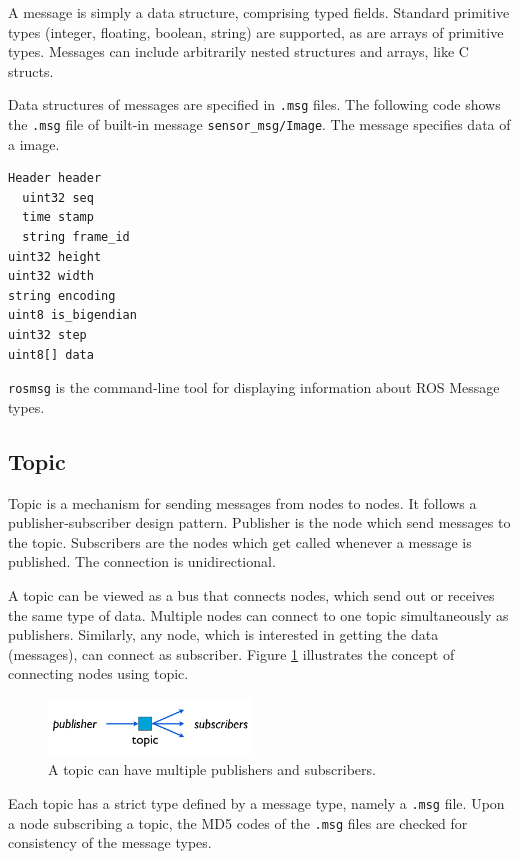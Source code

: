 \documentclass[a4paper, 10pt, conference]{ieeeconf}       %
\begin{document}
A message is simply a data structure, comprising typed fields. Standard primitive types (integer, floating, boolean, string) are supported, as are arrays of primitive types. Messages can include arbitrarily nested structures and arrays, like C structs.

Data structures of messages are specified in \texttt{.msg} files. The following code shows the \texttt{.msg} file of built-in message \texttt{sensor\_msg/Image}. The message specifies data of a image.

\vspace{8pt}
\begin{Verbatim}[frame=single]
Header header 
  uint32 seq 
  time stamp 
  string frame_id 
uint32 height 
uint32 width 
string encoding 
uint8 is_bigendian 
uint32 step 
uint8[] data
\end{Verbatim}

\texttt{rosmsg} is the command-line tool for displaying information about ROS Message types.

\subsection{Topic}

Topic is a mechanism for sending messages from nodes to nodes. It follows a publisher-subscriber design pattern. Publisher is the node which send messages to the topic. Subscribers are the nodes which get called whenever a message is published. The connection is unidirectional.

A topic can be viewed as a bus that connects nodes, which send out or receives the same type of data. Multiple nodes can connect to one topic simultaneously as publishers. Similarly, any node, which is interested in getting the data (messages), can connect as subscriber. Figure 
\ref{fig:topic} illustrates the concept of connecting nodes using topic.

\begin{figure}[htpb]
  \centering
  \includegraphics[width=0.48\textwidth]{topic}
  \caption{A topic can have multiple publishers and subscribers.}
  \label{fig:topic}
\end{figure}

Each topic has a strict type defined by a message type, namely a \texttt{.msg} file. Upon a node subscribing a topic, the MD5 codes of the \texttt{.msg} files are checked for consistency of the message types.
\end{document}

